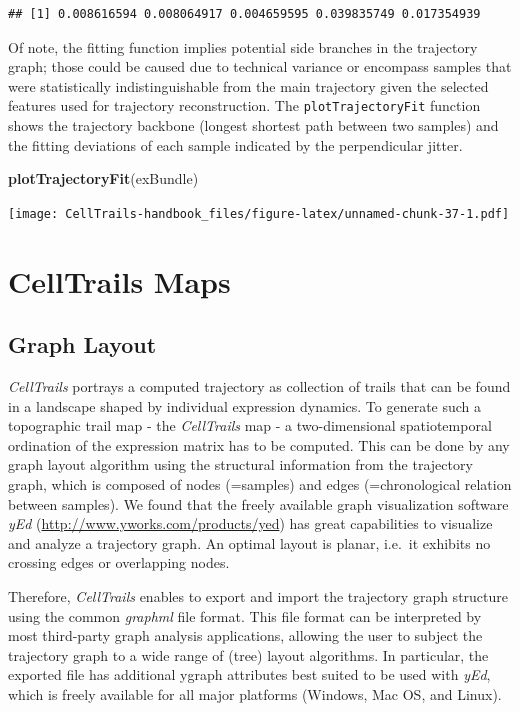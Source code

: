 \documentclass[]{book}
\newenvironment{Shaded}{\begin{snugshade}}{\end{snugshade}}
\newcommand{\KeywordTok}[1]{\textcolor[rgb]{0.13,0.29,0.53}{\textbf{#1}}}
\newcommand{\NormalTok}[1]{#1}
\theoremstyle{definition}
\theoremstyle{definition}
\theoremstyle{definition}
\theoremstyle{remark}
\begin{document}
\begin{verbatim}
## [1] 0.008616594 0.008064917 0.004659595 0.039835749 0.017354939
\end{verbatim}

Of note, the fitting function implies potential side branches in the
trajectory graph; those could be caused due to technical variance or
encompass samples that were statistically indistinguishable from the
main trajectory given the selected features used for trajectory
reconstruction. The \texttt{plotTrajectoryFit} function shows the
trajectory backbone (longest shortest path between two samples) and the
fitting deviations of each sample indicated by the perpendicular jitter.

\begin{Shaded}
\begin{Highlighting}[]
\KeywordTok{plotTrajectoryFit}\NormalTok{(exBundle)}
\end{Highlighting}
\end{Shaded}

\texttt{[image: CellTrails-handbook\_files/figure-latex/unnamed-chunk-37-1.pdf]}

\chapter{CellTrails Maps}\label{celltrails-maps}

\section{Graph Layout}\label{graph-layout}

\emph{CellTrails} portrays a computed trajectory as collection of trails
that can be found in a landscape shaped by individual expression
dynamics. To generate such a topographic trail map - the
\emph{CellTrails} map - a two-dimensional spatiotemporal ordination of
the expression matrix has to be computed. This can be done by any graph
layout algorithm using the structural information from the trajectory
graph, which is composed of nodes (=samples) and edges (=chronological
relation between samples). We found that the freely available graph
visualization software \emph{yEd}
(\url{http://www.yworks.com/products/yed}) has great capabilities to
visualize and analyze a trajectory graph. An optimal layout is planar,
i.e.~it exhibits no crossing edges or overlapping nodes.

Therefore, \emph{CellTrails} enables to export and import the trajectory
graph structure using the common \emph{graphml} file format. This file
format can be interpreted by most third-party graph analysis
applications, allowing the user to subject the trajectory graph to a
wide range of (tree) layout algorithms. In particular, the exported file
has additional ygraph attributes best suited to be used with \emph{yEd},
which is freely available for all major platforms (Windows, Mac OS, and
Linux).
\end{document}
